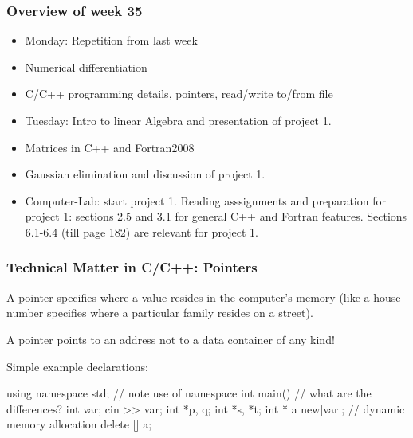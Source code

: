 \documentclass[handout]{beamer}
\newenvironment{block_mdfboxadmon}[1][]{\begin{block}{#1}}{\end{block}}
\begin{document}
\begin{frame}
\frametitle{Overview of week 35}

\begin{block_mdfboxadmon}[]
\begin{itemize}
  \item Monday: Repetition from last week

  \item Numerical differentiation

  \item C/C++ programming details, pointers, read/write to/from file

  \item Tuesday: Intro to linear Algebra and presentation of project 1.

  \item Matrices in C++ and Fortran2008

  \item Gaussian elimination and discussion of project 1.

  \item Computer-Lab: start project 1. Reading asssignments and preparation for project 1: sections 2.5 and 3.1 for general C++ and Fortran features. Sections 6.1-6.4 (till page 182) are relevant for project 1.
\end{itemize}

\noindent
\end{block_mdfboxadmon}
\end{frame}

\begin{frame}
\frametitle{Technical Matter in C/C++: Pointers}

\begin{block_mdfboxadmon}[]
A pointer specifies where a value resides in the computer's memory (like a house number specifies where a particular family resides on a street).

A pointer points to an address not to a data container of any kind!

Simple example declarations:

\begin{print}
  using namespace std; // note use of namespace
  int main()
 {
   // what are the differences?
   int var;
   cin >> var;
   int *p, q;
   int *s, *t;
   int * a new[var];    // dynamic memory allocation
   delete [] a;
}
\end{print}
\end{block_mdfboxadmon}
\end{frame}
\end{document}
